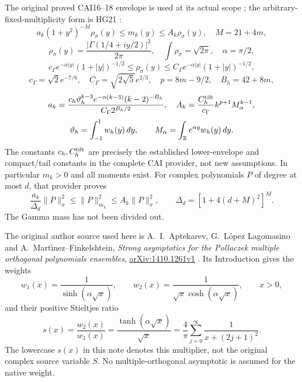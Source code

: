 The original proved CAI16--18 envelope is used at its actual scope
\cite{parity:CAI}; the arbitrary-fixed-multiplicity form is HG21 \cite{parity:HG}:
\begin{equation}\label{parity:eq:CAI}
 a_k(1+y^2)^{-M}\rho_\sigma(y)\leq m_k(y)\leq A_k\rho_\sigma(y),
 \quad M=21+4m,
\end{equation}
\[
 \rho_\sigma(y)=\frac{|\Gamma(1/4+iy/2)|^2}{2\pi},\quad
 \int\rho_\sigma=\sqrt{2\pi},\quad\alpha=\pi/2,
\]
\[
 c_\Gamma e^{-\alpha|y|}(1+|y|)^{-1/2}
 \leq\rho_\sigma(y)\leq
 C_\Gamma e^{-\alpha|y|}(1+|y|)^{-1/2},
\]
\[
 c_\Gamma=\sqrt2e^{-7/6},\quad C_\Gamma=\sqrt{2\sqrt5}e^{2/3},
 \quad p=8m-9/2,\quad B_h=42+8m,
\]
\[
 a_k=\frac{c_h\vartheta_h^{k-3}e^{-\alpha(k-3)}(k-2)^{-B_h}}
                   {C_\Gamma2^{B_h/2}},\quad
 A_k=\frac{C_h^{\rm tilt}}{c_\Gamma}k^{p+1}M_\alpha^{k-1},
\]
\[
 \vartheta_h=\int_{-1}^1w_h(y)\,dy,\qquad
 M_\alpha=\int_\mathbb R e^{\alpha y}w_h(y)\,dy.
\]
The constants $c_h,C_h^{\rm tilt}$ are precisely the established
lower-envelope and compact/tail constants in the complete CAI
provider, not new assumptions. In particular $m_k>0$ and all
moments exist. For complex polynomials $P$ of degree at most $d$,
that provider proves
\begin{equation}\label{parity:eq:CAI-finite}
 \frac{a_k}{\Delta_d}\|P\|_\sigma^2
       \leq\|P\|_{m_k}^2\leq A_k\|P\|_\sigma^2,
 \qquad \Delta_d=[1+4(d+M)^2]^M.
\end{equation}
The Gamma mass has not been divided out.

The original author source used here is A.~I.~Aptekarev,
G.~L\'opez Lagomasino and A.~Mart\'{\i}nez--Finkelshtein,
\emph{Strong asymptotics for the Pollaczek multiple orthogonal
polynomials ensembles},
\href{https://arxiv.org/abs/1410.1261v1}{arXiv:1410.1261v1}
\cite{parity:ALM}.
Its Introduction gives the weights
\begin{equation}\label{parity:eq:literature}
 w_1(x)=\frac1{\sinh(\alpha\sqrt x)},\qquad
 w_2(x)=\frac1{\sqrt x\cosh(\alpha\sqrt x)},\qquad x>0,
\end{equation}
and their positive Stieltjes ratio
\begin{equation}\label{parity:eq:S}
 s(x)=\frac{w_2(x)}{w_1(x)}
     =\frac{\tanh(\alpha\sqrt x)}{\sqrt x}
     =\frac4\pi\sum_{j=0}^{\infty}\frac1{x+(2j+1)^2}.
\end{equation}
The lowercase $s(x)$ in this note denotes this multiplier, not
the original complex source variable $S$. No multiple-orthogonal
asymptotic is assumed for the native weight.


